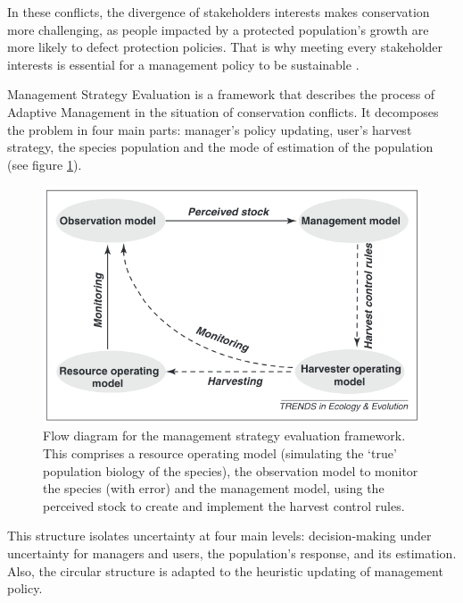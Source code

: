 \documentclass[12pt,a4paper]{article}
\begin{document}
In these conflicts, the divergence of stakeholders interests makes conservation more challenging, as people impacted by a protected population's growth are more likely to defect protection policies.
That is why meeting every stakeholder interests is essential for a management policy to be sustainable \citep{redpath2013understanding}.
%

Management Strategy Evaluation is a framework that describes the process of Adaptive Management in the situation of conservation conflicts.
It decomposes the problem in four main parts: manager's policy updating, user's harvest strategy, the species population and the mode of estimation of the population (see figure \ref{msediagram}).
\begin{figure}
	\centering
	\includegraphics[scale=0.5]{msediagram.png}
	\caption{Flow diagram for the management strategy evaluation framework. This comprises a resource operating model (simulating the ‘true’ population biology of the species), the observation model to monitor the species (with error) and the management model, using the perceived stock to create and implement the harvest control rules. \citep{BUNNEFELD2011441}}
	\label{msediagram}
\end{figure}
This structure isolates uncertainty at four main levels: decision-making under uncertainty for managers and users, the population's response,
and its estimation.
Also, the circular structure is adapted to the heuristic updating of management policy.
\end{document}
